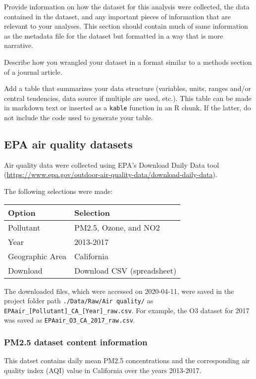 \documentclass[12pt,]{article}
\begin{document}
Provide information on how the dataset for this analysis were collected,
the data contained in the dataset, and any important pieces of
information that are relevant to your analyses. This section should
contain much of same information as the metadata file for the dataset
but formatted in a way that is more narrative.

Describe how you wrangled your dataset in a format similar to a methods
section of a journal article.

Add a table that summarizes your data structure (variables, units,
ranges and/or central tendencies, data source if multiple are used,
etc.). This table can be made in markdown text or inserted as a
\texttt{kable} function in an R chunk. If the latter, do not include the
code used to generate your table.

\hypertarget{epa-air-quality-datasets}{%
\subsection{EPA air quality datasets}\label{epa-air-quality-datasets}}

Air quality data were collected using EPA's Download Daily Data tool
(\url{https://www.epa.gov/outdoor-air-quality-data/download-daily-data}).

The following selections were made:

\begin{longtable}[]{@{}ll@{}}
\toprule
Option & Selection\tabularnewline
\midrule
\endhead
Pollutant & PM2.5, Ozone, and NO2\tabularnewline
Year & 2013-2017\tabularnewline
Geographic Area & California\tabularnewline
Download & Download CSV (spreadsheet)\tabularnewline
\bottomrule
\end{longtable}

The downloaded files, which were accessed on 2020-04-11, were saved in
the project folder path \texttt{./Data/Raw/Air\ quality/} as
\texttt{EPAair\_{[}Pollutant{]}\_CA\_{[}Year{]}\_raw.csv}. For example,
the O3 dataset for 2017 was saved as
\texttt{EPAair\_O3\_CA\_2017\_raw.csv}.

\hypertarget{pm2.5-dataset-content-information}{%
\subsubsection{PM2.5 dataset content
information}\label{pm2.5-dataset-content-information}}

This datset contains daily mean PM2.5 concentrations and the
corresponding air quality index (AQI) value in California over the years
2013-2017.
\end{document}
